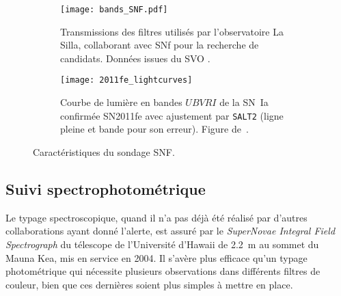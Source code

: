 \documentclass[../main/main.tex]{subfiles}
\begin{document}

\begin{figure}[ht]
    \centering
    \begin{subfigure}[]{.44\linewidth}
        \centering
        \texttt{[image: bands\_SNF.pdf]}
        \caption{Transmissions des filtres utilisés par l'observatoire La Silla,
        collaborant avec SNf pour la recherche de candidats. Données issues du
    SVO \citep{rodrigo2020}.}
        \label{fig:snfbands}
    \end{subfigure}
    \hfill
    \begin{subfigure}[]{.54\linewidth}
        \centering
        \texttt{[image: 2011fe\_lightcurves]}
        \caption{Courbe de lumière en bandes $UBVRI$ de la SN~Ia confirmée
            SN2011fe avec ajustement par \texttt{SALT2} (ligne pleine et bande
        pour son erreur). Figure de~\cite{pereira2013}.}
        \label{fig:snflc}
    \end{subfigure}
    \caption{Caractéristiques du sondage SNF.}
\end{figure}

\subsection{Suivi spectrophotométrique}\label{ssec:snfspectro}

Le typage spectroscopique, quand il n'a pas déjà été réalisé par d'autres
collaborations ayant donné l'alerte, est assuré par le \textit{SuperNovae
Integral Field Spectrograph} \citep[SNIFS,][]{lantz2004} du télescope de
l'Université d'Hawaii de \SI{2,2}{m} au sommet du Mauna Kea, mis en service en
2004. Il s'avère plus efficace qu'un typage photométrique qui nécessite
plusieurs observations dans différents filtres de couleur, bien que ces
dernières soient plus simples à mettre en place.
\end{document}
